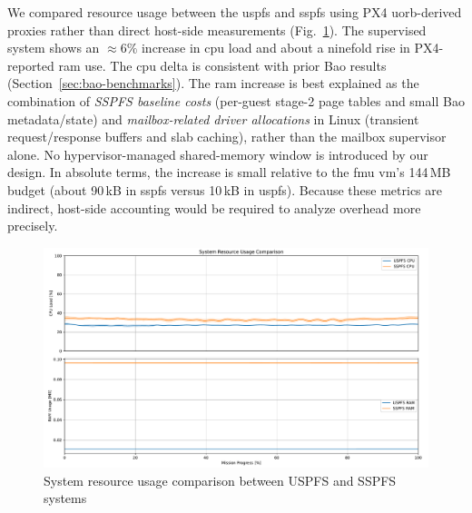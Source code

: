 We compared resource usage between the \gls{uspfs} and \gls{sspfs} using
PX4 \gls{uorb}-derived proxies rather than direct host-side measurements
(Fig.~\ref{fig:sys-resources-cmp}). The supervised system shows an
\(\approx 6\%\) increase in \gls{cpu} load and about a ninefold rise in
PX4-reported \gls{ram} use. The \gls{cpu} delta is consistent with prior Bao
results (Section~\ref{sec:bao-benchmarks}). The \gls{ram} increase is best
explained as the combination of \emph{SSPFS baseline costs} (per-guest
stage-2 page tables and small Bao metadata/state) and \emph{mailbox-related
driver allocations} in Linux (transient request/response buffers and slab
caching), rather than the mailbox supervisor alone. No hypervisor-managed
shared-memory window is introduced by our design. In absolute terms, the
increase is small relative to the \gls{fmu} \gls{vm}'s 144\,MB budget
(about 90\,kB in \gls{sspfs} versus 10\,kB in \gls{uspfs}). Because these
metrics are indirect, host-side accounting would be required to analyze
overhead more precisely.

\begin{figure}[!hbt]
  \centering
  \includegraphics[width=1.0\textwidth]{./img/pdf/sys-resources-cmp} 
  \caption{System resource usage comparison between USPFS and SSPFS systems}%
  \label{fig:sys-resources-cmp}
\end{figure}

